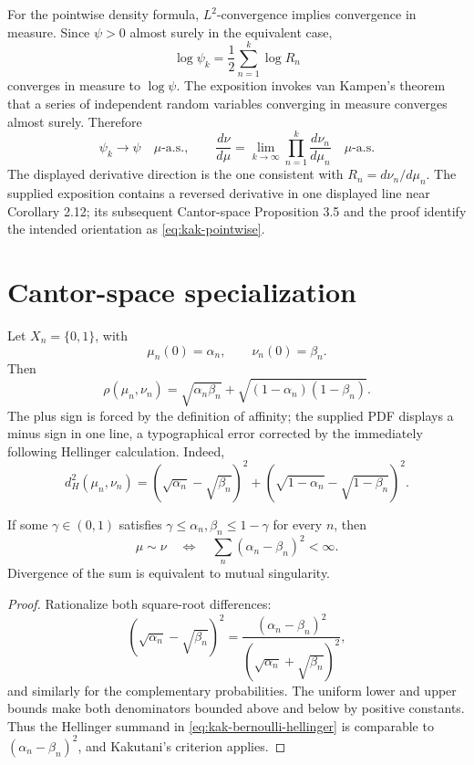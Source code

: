 For the pointwise density formula, \(L^2\)-convergence implies convergence in measure.  Since
\(\psi>0\) almost surely in the equivalent case,
\[
 \log\psi_k=\frac12\sum_{n=1}^k\log R_n
\]
converges in measure to \(\log\psi\).  The exposition invokes van Kampen's theorem that a series of
independent random variables converging in measure converges almost surely.  Therefore
\begin{equation}\label{eq:kak-pointwise}
 \psi_k\to\psi\quad\mu\text{-a.s.},
 \qquad
 \frac{d\nu}{d\mu}
 =\lim_{k\to\infty}\prod_{n=1}^k\frac{d\nu_n}{d\mu_n}
 \quad\mu\text{-a.s.}
\end{equation}
The displayed derivative direction is the one consistent with \(R_n=d\nu_n/d\mu_n\).  The supplied
exposition contains a reversed derivative in one displayed line near Corollary 2.12; its subsequent
Cantor-space Proposition 3.5 and the proof identify the intended orientation as
\eqref{eq:kak-pointwise}.

\section{Cantor-space specialization}
Let \(X_n=\{0,1\}\), with
\[
 \mu_n(0)=\alpha_n,
 \qquad
 \nu_n(0)=\beta_n.
\]
Then
\begin{equation}\label{eq:kak-bernoulli-rho}
 \rho(\mu_n,\nu_n)
 =\sqrt{\alpha_n\beta_n}
  +\sqrt{(1-\alpha_n)(1-\beta_n)}.
\end{equation}
The plus sign is forced by the definition of affinity; the supplied PDF displays a minus sign in one
line, a typographical error corrected by the immediately following Hellinger calculation.  Indeed,
\begin{equation}\label{eq:kak-bernoulli-hellinger}
 d_H^2(\mu_n,\nu_n)
 =(\sqrt{\alpha_n}-\sqrt{\beta_n})^2
 +(\sqrt{1-\alpha_n}-\sqrt{1-\beta_n})^2.
\end{equation}

\begin{proposition}[Proposition 3.2]
If some \(\gamma\in(0,1)\) satisfies
\(\gamma\le\alpha_n,\beta_n\le1-\gamma\) for every \(n\), then
\[
 \mu\sim\nu
 \quad\Longleftrightarrow\quad
 \sum_n(\alpha_n-\beta_n)^2<\infty.
\]
Divergence of the sum is equivalent to mutual singularity.
\end{proposition}

\begin{proof}
Rationalize both square-root differences:
\[
 (\sqrt{\alpha_n}-\sqrt{\beta_n})^2
 =\frac{(\alpha_n-\beta_n)^2}
       {(\sqrt{\alpha_n}+\sqrt{\beta_n})^2},
\]
and similarly for the complementary probabilities.  The uniform lower and upper bounds make both
denominators bounded above and below by positive constants.  Thus the Hellinger summand in
\eqref{eq:kak-bernoulli-hellinger} is comparable to \((\alpha_n-\beta_n)^2\), and Kakutani's
criterion applies.
\end{proof}

